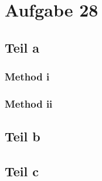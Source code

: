 \documentclass[10pt,a4paper]{article}
\begin{document}
\section{Aufgabe 28}

\subsection{Teil a}

\subsubsection{Method i}

\subsubsection{Method ii}

\subsection{Teil b}

\subsection{Teil c}
\end{document}
